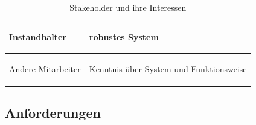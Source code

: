 \documentclass[a4paper, 11pt]{article}
\begin{document}
\begin{table}[H]
\begin{tabularx}{\textwidth}{|X|X|}
    \hline
    Instandhalter&\begin{compactenum}[-]
        \item robustes System
    \end{compactenum}\\
    \hline
    Andere Mitarbeiter&\begin{compactenum}[-]
        \item Kenntnis über System und Funktionsweise
    \end{compactenum}\\
    \hline
    \end{tabularx}
    \caption{Stakeholder und ihre Interessen}
    \label{stake}
\end{table}

\newpage

\subsection{Anforderungen}
\end{document}
